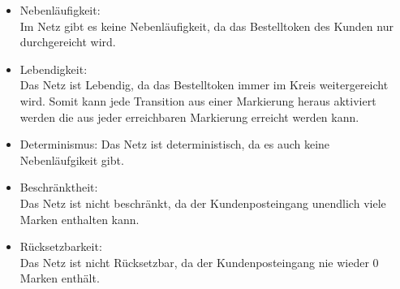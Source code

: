 \documentclass[a4paper,12pt]{scrartcl}
\begin{document}
\begin{itemize}
  \item{Nebenläufigkeit:}\\
  Im Netz gibt es keine Nebenläufigkeit, da das Bestelltoken des Kunden nur durchgereicht wird.
  \item{Lebendigkeit:}\\
  Das Netz ist Lebendig, da das Bestelltoken immer im Kreis weitergereicht wird. Somit kann jede Transition aus einer Markierung heraus aktiviert werden die aus jeder erreichbaren Markierung erreicht werden kann.
  \item{Determinismus:}
  Das Netz ist deterministisch, da es auch keine Nebenläufgikeit gibt.
  \item{Beschränktheit:}\\
  Das Netz ist nicht beschränkt, da der Kundenposteingang unendlich viele Marken enthalten kann.
  \item{Rücksetzbarkeit:}\\
  Das Netz ist nicht Rücksetzbar, da der Kundenposteingang nie wieder 0 Marken enthält.
\end{itemize}

\end{document}

